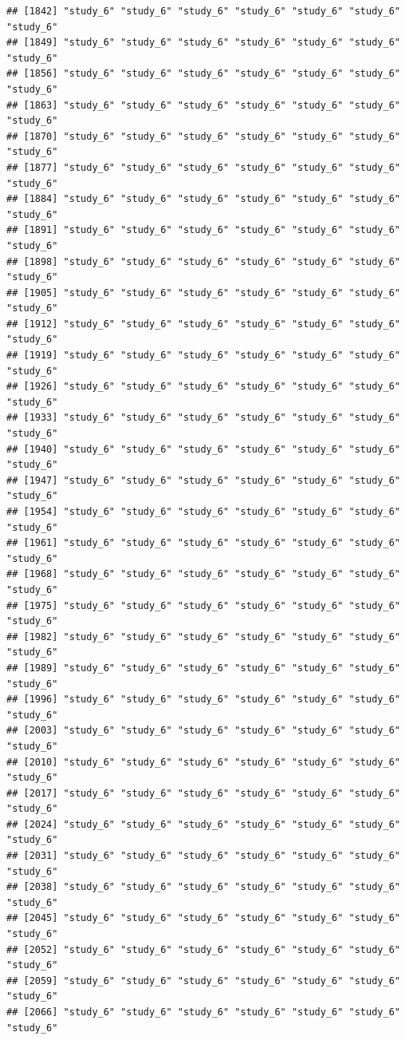 \documentclass[
  american,
  man,floatsintext]{apa7}
\begin{document}
\begin{verbatim}
## [1842] "study_6" "study_6" "study_6" "study_6" "study_6" "study_6" "study_6"
## [1849] "study_6" "study_6" "study_6" "study_6" "study_6" "study_6" "study_6"
## [1856] "study_6" "study_6" "study_6" "study_6" "study_6" "study_6" "study_6"
## [1863] "study_6" "study_6" "study_6" "study_6" "study_6" "study_6" "study_6"
## [1870] "study_6" "study_6" "study_6" "study_6" "study_6" "study_6" "study_6"
## [1877] "study_6" "study_6" "study_6" "study_6" "study_6" "study_6" "study_6"
## [1884] "study_6" "study_6" "study_6" "study_6" "study_6" "study_6" "study_6"
## [1891] "study_6" "study_6" "study_6" "study_6" "study_6" "study_6" "study_6"
## [1898] "study_6" "study_6" "study_6" "study_6" "study_6" "study_6" "study_6"
## [1905] "study_6" "study_6" "study_6" "study_6" "study_6" "study_6" "study_6"
## [1912] "study_6" "study_6" "study_6" "study_6" "study_6" "study_6" "study_6"
## [1919] "study_6" "study_6" "study_6" "study_6" "study_6" "study_6" "study_6"
## [1926] "study_6" "study_6" "study_6" "study_6" "study_6" "study_6" "study_6"
## [1933] "study_6" "study_6" "study_6" "study_6" "study_6" "study_6" "study_6"
## [1940] "study_6" "study_6" "study_6" "study_6" "study_6" "study_6" "study_6"
## [1947] "study_6" "study_6" "study_6" "study_6" "study_6" "study_6" "study_6"
## [1954] "study_6" "study_6" "study_6" "study_6" "study_6" "study_6" "study_6"
## [1961] "study_6" "study_6" "study_6" "study_6" "study_6" "study_6" "study_6"
## [1968] "study_6" "study_6" "study_6" "study_6" "study_6" "study_6" "study_6"
## [1975] "study_6" "study_6" "study_6" "study_6" "study_6" "study_6" "study_6"
## [1982] "study_6" "study_6" "study_6" "study_6" "study_6" "study_6" "study_6"
## [1989] "study_6" "study_6" "study_6" "study_6" "study_6" "study_6" "study_6"
## [1996] "study_6" "study_6" "study_6" "study_6" "study_6" "study_6" "study_6"
## [2003] "study_6" "study_6" "study_6" "study_6" "study_6" "study_6" "study_6"
## [2010] "study_6" "study_6" "study_6" "study_6" "study_6" "study_6" "study_6"
## [2017] "study_6" "study_6" "study_6" "study_6" "study_6" "study_6" "study_6"
## [2024] "study_6" "study_6" "study_6" "study_6" "study_6" "study_6" "study_6"
## [2031] "study_6" "study_6" "study_6" "study_6" "study_6" "study_6" "study_6"
## [2038] "study_6" "study_6" "study_6" "study_6" "study_6" "study_6" "study_6"
## [2045] "study_6" "study_6" "study_6" "study_6" "study_6" "study_6" "study_6"
## [2052] "study_6" "study_6" "study_6" "study_6" "study_6" "study_6" "study_6"
## [2059] "study_6" "study_6" "study_6" "study_6" "study_6" "study_6" "study_6"
## [2066] "study_6" "study_6" "study_6" "study_6" "study_6" "study_6" "study_6"

\end{verbatim}
\end{document}
